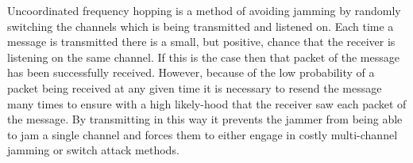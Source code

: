 \documentclass[sigconf, anonymous]{acmart}
\begin{document}
Uncoordinated frequency hopping is a method of avoiding jamming by randomly switching the channels which is being transmitted and listened on. %
Each time a message is transmitted there is a small, but positive, chance that the receiver is listening on the same channel. If this is the case then that packet of the message has been successfully received. However, because of the low probability of a packet being received at any given time it is necessary to resend the message many times to ensure with a high likely-hood that the receiver saw each packet of the message. By transmitting in this way it prevents the jammer from being able to jam a single channel and forces them to either engage in costly multi-channel jamming or switch attack methods. 


    
    
    
    
    
    
    
    
    
    
\end{document}
